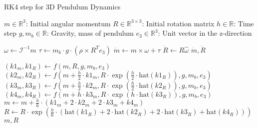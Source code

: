 \begin{algorithm}
\caption{RK4 step for 3D Pendulum Dynamics}
\begin{algorithmic}[1]
\Require $m \in \mathbb{R}^3$: Initial angular momentum
\Require $R \in \mathbb{R}^{3 \times 3}$: Initial rotation matrix
\Require $h \in \mathbb{R}$: Time step
\Require $g, m_b \in \mathbb{R}$: Gravity, mass of pendulum
\Require $e_3 \in \mathbb{R}^3$: Unit vector in the z-direction

    \State $\omega \gets \mathcal{I}^{-1}m$
    \State $\tau \gets m_b \cdot g \cdot (\rho \times R^T e_3)$
    \State $\dot{m} \gets m \times \omega + \tau$
    \State $\dot{R} \gets R \hat{\omega}$
    \State \Return $\dot{m}, \dot{R}$
\EndFunction

    \State $(k1_m, k1_R) \gets f(m, R, g, m_b, e_3)$
    \State $(k2_m, k2_R) \gets f(m + \frac{h}{2} \cdot k1_m, R \cdot \exp(\frac{h}{2} \cdot \text{hat}(k1_R)), g, m_b, e_3)$
    \State $(k3_m, k3_R) \gets f(m + \frac{h}{2} \cdot k2_m, R \cdot \exp(\frac{h}{2} \cdot \text{hat}(k2_R)), g, m_b, e_3)$
    \State $(k4_m, k4_R) \gets f(m + h \cdot k3_m, R \cdot \exp(h \cdot \text{hat}(k3_R)), g, m_b, e_3)$
    \State $m \gets m + \frac{h}{6} \cdot (k1_m + 2 \cdot k2_m + 2 \cdot k3_m + k4_m)$
    \State $R \gets R \cdot \exp(\frac{h}{6} \cdot (\text{hat}(k1_R) + 2 \cdot \text{hat}(k2_R) + 2 \cdot \text{hat}(k3_R) + \text{hat}(k4_R)))$
    \State \Return $m, R$
\EndFunction



\end{algorithmic}
\end{algorithm}
    